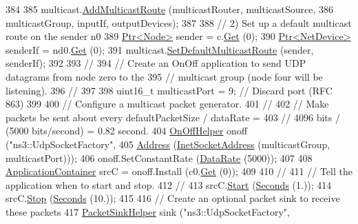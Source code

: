 \begin{DoxyCode}
384 
385   multicast.\hyperlink{classns3_1_1Ipv4StaticRoutingHelper_aa8d55f28361e24aefb961fe2eddc2192}{AddMulticastRoute} (multicastRouter, multicastSource, 
386                                multicastGroup, inputIf, outputDevices);
387 
388   \textcolor{comment}{// 2) Set up a default multicast route on the sender n0 }
389   \hyperlink{classns3_1_1Ptr}{Ptr<Node>} sender = c.\hyperlink{classns3_1_1NodeContainer_a9ed96e2ecc22e0f5a3d4842eb9bf90bf}{Get} (0);
390   \hyperlink{classns3_1_1Ptr}{Ptr<NetDevice>} senderIf = nd0.\hyperlink{classns3_1_1NetDeviceContainer_a677d62594b5c9d2dea155cc5045f4d0b}{Get} (0);
391   multicast.\hyperlink{classns3_1_1Ipv4StaticRoutingHelper_ae69a07ded3139dfd4e21bb7c10eba416}{SetDefaultMulticastRoute} (sender, senderIf);
392 
393   \textcolor{comment}{//}
394   \textcolor{comment}{// Create an OnOff application to send UDP datagrams from node zero to the}
395   \textcolor{comment}{// multicast group (node four will be listening).}
396   \textcolor{comment}{//}
397 
398   uint16\_t multicastPort = 9;   \textcolor{comment}{// Discard port (RFC 863)}
399 
400   \textcolor{comment}{// Configure a multicast packet generator.}
401   \textcolor{comment}{//}
402   \textcolor{comment}{// Make packets be sent about every defaultPacketSize / dataRate = }
403   \textcolor{comment}{// 4096 bits / (5000 bits/second) = 0.82 second.}
404   \hyperlink{classns3_1_1OnOffHelper}{OnOffHelper} onoff (\textcolor{stringliteral}{"ns3::UdpSocketFactory"}, 
405                      \hyperlink{classns3_1_1Address}{Address} (\hyperlink{classns3_1_1InetSocketAddress}{InetSocketAddress} (multicastGroup, multicastPort)));
406   onoff.SetConstantRate (\hyperlink{classns3_1_1DataRate}{DataRate} (5000));
407 
408   \hyperlink{classns3_1_1ApplicationContainer}{ApplicationContainer} srcC = onoff.Install (c0.\hyperlink{classns3_1_1NodeContainer_a9ed96e2ecc22e0f5a3d4842eb9bf90bf}{Get} (0));
409 
410   \textcolor{comment}{//}
411   \textcolor{comment}{// Tell the application when to start and stop.}
412   \textcolor{comment}{//}
413   srcC.\hyperlink{classns3_1_1ApplicationContainer_a8eff87926507020bbe3e1390358a54a7}{Start} (\hyperlink{group__timecivil_ga33c34b816f8ff6628e33d5c8e9713b9e}{Seconds} (1.));
414   srcC.\hyperlink{classns3_1_1ApplicationContainer_adfc52f9aa4020c8714679b00bbb9ddb3}{Stop} (\hyperlink{group__timecivil_ga33c34b816f8ff6628e33d5c8e9713b9e}{Seconds} (10.));
415 
416   \textcolor{comment}{// Create an optional packet sink to receive these packets}
417   \hyperlink{classns3_1_1PacketSinkHelper}{PacketSinkHelper} sink (\textcolor{stringliteral}{"ns3::UdpSocketFactory"},

\end{DoxyCode}
